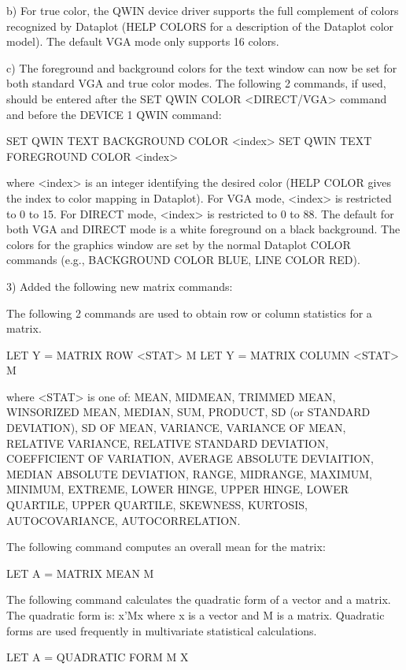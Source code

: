 {    b) For true color, the QWIN device driver supports the full
       complement of colors recognized by Dataplot (HELP COLORS
       for a description of the Dataplot color model).  The default
       VGA mode only supports 16 colors.

    c) The foreground and background colors for the text window
       can now be set for both standard VGA and true color modes.
       The following 2 commands, if used, should be entered
       after the SET QWIN COLOR <DIRECT/VGA> command and before
       the DEVICE 1 QWIN command:

          SET QWIN TEXT BACKGROUND COLOR <index>
          SET QWIN TEXT FOREGROUND COLOR <index>

       where <index> is an integer identifying the desired
       color (HELP COLOR gives the index to color mapping in
       Dataplot).  For VGA mode, <index> is restricted to 0 to
       15.  For DIRECT mode, <index> is restricted to 0 to 88.
       The default for both VGA and DIRECT mode is a white
       foreground on a black background.  The colors for the
       graphics window are set by the normal Dataplot COLOR
       commands (e.g., BACKGROUND COLOR BLUE, LINE COLOR RED).

 3) Added the following new matrix commands:

    The following 2 commands are used to obtain row or column
    statistics for a matrix.

       LET Y = MATRIX ROW <STAT> M
       LET Y = MATRIX COLUMN <STAT> M

    where <STAT> is one of: MEAN, MIDMEAN, TRIMMED MEAN,
    WINSORIZED MEAN, MEDIAN, SUM, PRODUCT, SD (or STANDARD DEVIATION),
    SD OF MEAN, VARIANCE, VARIANCE OF MEAN, RELATIVE VARIANCE,
    RELATIVE STANDARD DEVIATION, COEFFICIENT OF VARIATION, 
    AVERAGE ABSOLUTE DEVIAITION, MEDIAN ABSOLUTE DEVIATION, RANGE,
    MIDRANGE, MAXIMUM, MINIMUM, EXTREME, LOWER HINGE, UPPER HINGE,
    LOWER QUARTILE, UPPER QUARTILE, SKEWNESS, KURTOSIS, 
    AUTOCOVARIANCE, AUTOCORRELATION.

    The following command computes an overall mean for the matrix:

        LET A = MATRIX MEAN M

    The following command calculates the quadratic form of a
    vector and a matrix.  The quadratic form is: x'Mx where x
    is a vector and M is a matrix.  Quadratic forms are used
    frequently in  multivariate statistical calculations.

        LET A = QUADRATIC FORM M X

}
